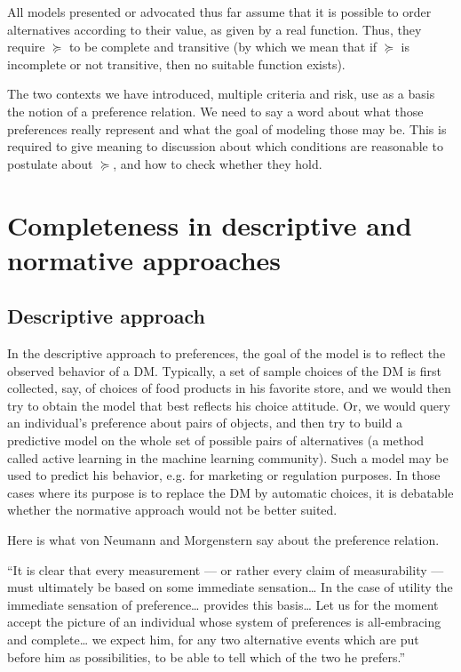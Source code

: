 \documentclass[french, english]{llncs}
\begin{document}
	All models presented or advocated thus far assume that it is possible to order alternatives according to their value, as given by a real function. Thus, they require $\succeq$ to be complete and transitive (by which we mean that if $\succeq$ is incomplete or not transitive, then no suitable function exists).
	
	The two contexts we have introduced, multiple criteria and risk, use as a basis the notion of a preference relation. We need to say a word about what those preferences really represent and what the goal of modeling those may be. This is required to give meaning to discussion about which conditions are reasonable to postulate about $\succeq$, and how to check whether they hold.
	
	\section{Completeness in descriptive and normative approaches}
	
	
	
	\subsection{Descriptive approach}
	In the descriptive approach to preferences, the goal of the model is to reflect the observed behavior of a \ac{DM}. Typically, a set of sample choices of the \ac{DM} is first collected, say, of choices of food products in his favorite store, and we would then try to obtain the model that best reflects his choice attitude. Or, we would query an individual’s preference about pairs of objects, and then try to build a predictive model on the whole set of possible pairs of alternatives (a method called active learning in the machine learning community). Such a model may be used to predict his behavior, e.g. for marketing or regulation purposes. In those cases where its purpose is to replace the \ac{DM} by automatic choices, it is debatable whether the normative approach would not be better suited.
	
	Here is what von Neumann and Morgenstern say about the preference relation.
	
	“It is clear that every measurement --- or rather every claim of measurability --- must ultimately be based on some immediate sensation\ldots
	In the case of utility the immediate sensation of preference\ldots%
	provides this basis\ldots %
	Let us for the moment accept the picture of an individual whose system of preferences is all-embracing and complete\ldots%
	 we expect him, for any two alternative events which are put before him as possibilities, to be able to tell which of the two he prefers.” %
	
\end{document}
